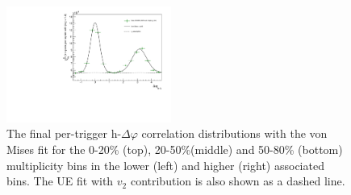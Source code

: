 \begin{figure}[ht]
    \includegraphics[width=0.48\textwidth]{figures/analysis/h_lambda_dphi_von_50_80_highpt.pdf}
    \caption{The final per-trigger h-\lmb $\Delta\varphi$ correlation distributions with the von Mises fit for the 0-20\% (top), 20-50\%(middle) and 50-80\% (bottom) multiplicity bins in the lower (left) and higher (right) associated \pt bins. The UE fit with $v_{2}$ contribution is also shown as a dashed line.}
    \label{fig:von_fits_lambda}
\end{figure}


